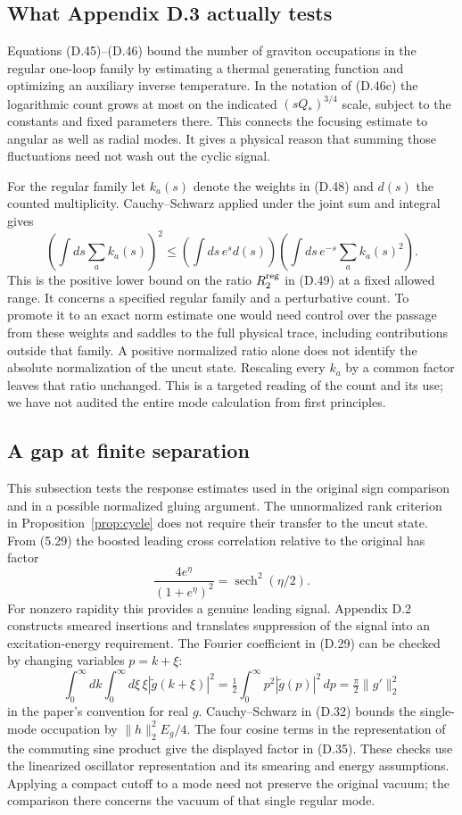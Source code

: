 \documentclass[11pt]{article}
\begin{document}
\subsection{What Appendix D.3 actually tests}
Equations (D.45)--(D.46) bound the number of graviton occupations in the regular one-loop family by estimating a thermal generating function and optimizing an auxiliary inverse temperature. In the notation of (D.46c) the logarithmic count grows at most on the indicated $(sQ_*)^{3/4}$ scale, subject to the constants and fixed parameters there. This connects the focusing estimate to angular as well as radial modes. It gives a physical reason that summing those fluctuations need not wash out the cyclic signal.

For the regular family let $k_a(s)$ denote the weights in (D.48) and $d(s)$ the counted multiplicity. Cauchy--Schwarz applied under the joint sum and integral gives
\[
 \left(\int ds\sum_a k_a(s)\right)^2
 \le \left(\int ds\, e^s d(s)\right)
     \left(\int ds\,e^{-s}\sum_a k_a(s)^2\right).
\]
This is the positive lower bound on the ratio $R_2^{\rm reg}$ in (D.49) at a fixed allowed range. It concerns a specified regular family and a perturbative count. To promote it to an exact norm estimate one would need control over the passage from these weights and saddles to the full physical trace, including contributions outside that family. A positive normalized ratio alone does not identify the absolute normalization of the uncut state. Rescaling every $k_a$ by a common factor leaves that ratio unchanged. This is a targeted reading of the count and its use; we have not audited the entire mode calculation from first principles.

\subsection{A gap at finite separation}
This subsection tests the response estimates used in the original sign comparison and in a possible normalized gluing argument. The unnormalized rank criterion in Proposition~\ref{prop:cycle} does not require their transfer to the uncut state.
From (5.29) the boosted leading cross correlation relative to the original has factor
\[
 \frac{4e^\eta}{(1+e^\eta)^2}=\operatorname{sech}^2(\eta/2).
\]
For nonzero rapidity this provides a genuine leading signal. Appendix D.2 constructs smeared insertions and translates suppression of the signal into an excitation-energy requirement. The Fourier coefficient in (D.29) can be checked by changing variables $p=k+\xi$:
\[
 \int_0^\infty dk\int_0^\infty d\xi\,\xi|\widetilde g(k+\xi)|^2
 =\tfrac12\int_0^\infty p^2|\widetilde g(p)|^2\,dp
 =\tfrac{\pi}{2}\|g'\|_2^2
\]
in the paper's convention for real $g$. Cauchy--Schwarz in (D.32) bounds the single-mode occupation by $\|h\|_2^2 E_g/4$. The four cosine terms in the representation of the commuting sine product give the displayed factor in (D.35). These checks use the linearized oscillator representation and its smearing and energy assumptions. Applying a compact cutoff to a mode need not preserve the original vacuum; the comparison there concerns the vacuum of that single regular mode.
\end{document}
